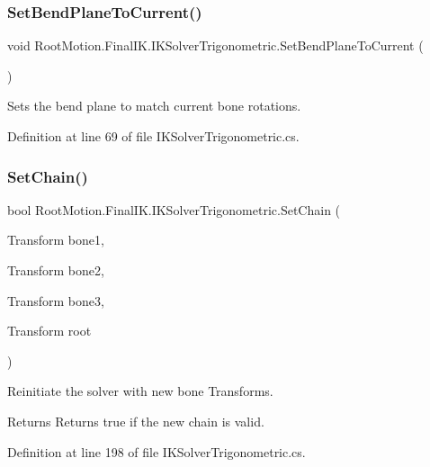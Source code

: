 \subsubsection{\texorpdfstring{Set\+Bend\+Plane\+To\+Current()}{SetBendPlaneToCurrent()}}
{\footnotesize\ttfamily void Root\+Motion.\+Final\+I\+K.\+I\+K\+Solver\+Trigonometric.\+Set\+Bend\+Plane\+To\+Current (\begin{DoxyParamCaption}{ }\end{DoxyParamCaption})}



Sets the bend plane to match current bone rotations. 



Definition at line 69 of file I\+K\+Solver\+Trigonometric.\+cs.

\mbox{\label{class_root_motion_1_1_final_i_k_1_1_i_k_solver_trigonometric_a4a5e5e9b02e9a47ab2caa0b14c656b0c}} 
\subsubsection{\texorpdfstring{Set\+Chain()}{SetChain()}}
{\footnotesize\ttfamily bool Root\+Motion.\+Final\+I\+K.\+I\+K\+Solver\+Trigonometric.\+Set\+Chain (\begin{DoxyParamCaption}\item[{Transform}]{bone1,  }\item[{Transform}]{bone2,  }\item[{Transform}]{bone3,  }\item[{Transform}]{root }\end{DoxyParamCaption})}



Reinitiate the solver with new bone Transforms. 

\begin{DoxyReturn}{Returns}
Returns true if the new chain is valid. 
\end{DoxyReturn}


Definition at line 198 of file I\+K\+Solver\+Trigonometric.\+cs.

\mbox{\label{class_root_motion_1_1_final_i_k_1_1_i_k_solver_trigonometric_ac46bbda2f611739b743693bd597a3ac3}} 
